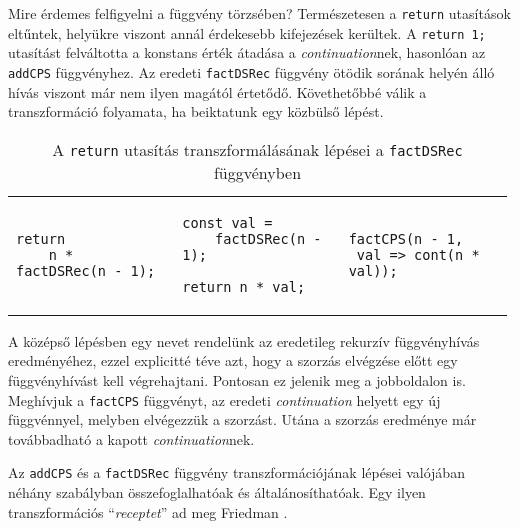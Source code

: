 Mire érdemes felfigyelni a függvény törzsében? Természetesen a \texttt{return} utasítások eltűntek, helyükre viszont annál érdekesebb kifejezések kerültek. A \texttt{return 1;} utasítást felváltotta a konstans érték átadása a \textit{continuation}nek, hasonlóan az \texttt{addCPS} függvényhez. Az eredeti \texttt{factDSRec} függvény ötödik sorának helyén álló hívás viszont már nem ilyen magától értetődő. Követhetőbbé válik a transzformáció folyamata, ha beiktatunk egy közbülső lépést.

\lstset{language=JavaScript, numbers=none, breaklines=true}

\begin{table}[h]
\captionsetup{justification=centering}
\centering
\begin{tabular}{p{0.33\linewidth} | p{0.33\linewidth} | p{0.33\linewidth}}
\begin{lstlisting}
return
    n * factDSRec(n - 1);
\end{lstlisting}&
\begin{lstlisting}
const val =
    factDSRec(n - 1);

return n * val;
\end{lstlisting}&
\begin{lstlisting}
factCPS(n - 1, 
 val => cont(n * val));
\end{lstlisting} 
\end{tabular}
\caption{A \texttt{return} utasítás transzformálásának lépései a \texttt{factDSRec} függvényben}  
\label{table:steps}
\end{table}


A középső lépésben egy nevet rendelünk az eredetileg rekurzív függvényhívás eredményéhez, ezzel explicitté téve azt, hogy a szorzás elvégzése előtt egy függvényhívást kell végrehajtani. Pontosan ez jelenik meg a jobboldalon is. Meghívjuk a \texttt{factCPS} függvényt, az eredeti \textit{continuation} helyett egy új függvénnyel, melyben elvégezzük a szorzást. Utána a szorzás eredménye már továbbadható a kapott \textit{continuation}nek.

Az \texttt{addCPS} és a \texttt{factDSRec} függvény transzformációjának lépései valójában néhány szabályban összefoglalhatóak és általánosíthatóak. Egy ilyen transzformációs ``\textit{receptet}'' ad meg Friedman \citeyear{EssProgLan}.

